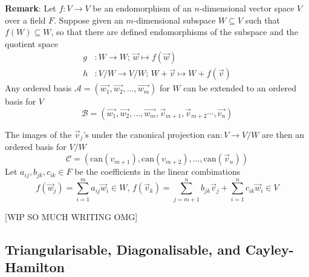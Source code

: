 \documentclass{article}
\begin{document}
\textbf{Remark}: Let $f : V\to V$ be an endomorphism of an $n$-dimensional vector space $V$ over a field $F$. Suppose given an $m$-dimensional subspace $W\subseteq V$ such that $f(W)\subseteq W$, so that there are defined endomorphisms of the subspace and the quotient space
\begin{align*}
    g &: W \to W;\, \vec{w}\mapsto f(\vec{w})\\
    h &: V / W \to V / W;\, W + \vec{v} \mapsto W + f(\vec{v})
\end{align*}
Any ordered basis $\mathcal{A} = (\vec{w_{1}},\vec{w_{2}},\dots,\vec{w_{m}})$ for $W$ can be extended to an ordered basis for $V$
\[\mathcal{B} = (\vec{w_{1}}, \vec{w_{2}},\dots,\vec{w_{m}},\vec{v}_{m+1},\vec{v}_{m+2}\cdots,\vec{v_{n}})\]

The images of the $\vec{v}_{j}$'s under the canonical projection $\text{can} : V\to V / W$ are then an ordered basis for $V / W$
\[\mathcal{C} = (\text{can}(v_{m + 1}), \text{can}(v_{m + 2}),\dots,\text{can}(\vec{v}_{n}))\]
Let $a_{ij},b_{jk},c_{ik}\in F$ be the coefficients in the linear combinations
\[f(\vec{w}_{j}) = \sum_{i = 1}^{m}a_{ij}\vec{w}_{i}\in W,\,f(\vec{v}_{k}) = \sum_{j = m+1}^{n} b_{jk}\vec{v}_{j} + \sum_{i = 1}^{n}c_{ik}\vec{w}_{i}\in V\]

[WIP SO MUCH WRITING OMG]

\newpage
\subsection{Triangularisable, Diagonalisable, and Cayley-Hamilton}
\end{document}
